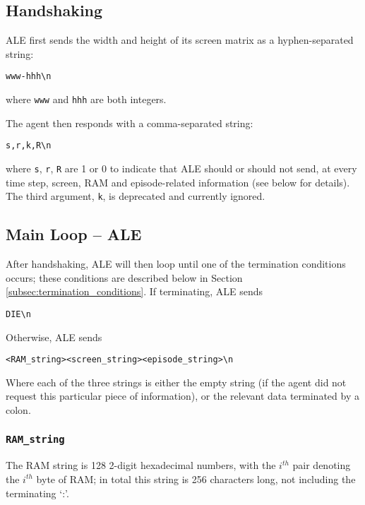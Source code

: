 \documentclass[12pt]{article}
\begin{document}
\subsection{Handshaking}

ALE first sends the width and height of its screen matrix as a hyphen-separated string:

\begin{verbatim}
www-hhh\n
\end{verbatim}

where \verb+www+ and \verb+hhh+ are both integers.

The agent then responds with a comma-separated string:

\begin{verbatim}
s,r,k,R\n
\end{verbatim}

where \verb+s+, \verb+r+, \verb+R+ are 1 or 0 to indicate that ALE should or should not send, at every time step, screen, RAM and episode-related information (see below for details). The third argument, \verb+k+, is deprecated and currently ignored.

\subsection{Main Loop -- ALE}

After handshaking, ALE will then loop until one of the termination conditions occurs; these conditions are described below in Section \ref{subsec:termination_conditions}. If terminating, ALE sends

\begin{verbatim}
DIE\n
\end{verbatim}

Otherwise, ALE sends

\begin{verbatim}
<RAM_string><screen_string><episode_string>\n
\end{verbatim}

Where each of the three strings is either the empty string (if the agent did not request this
particular piece of information), or the relevant data terminated by a colon.

\subsubsection{\texttt{RAM\_string}}

The RAM string is 128 2-digit hexadecimal numbers, with the $i^{th}$ pair denoting the
$i^{th}$ byte of RAM; in total this string is 256 characters long, not including the terminating
`:'.
\end{document}
